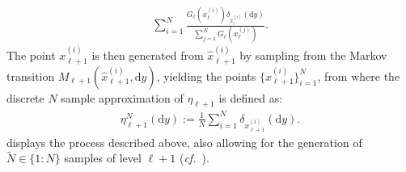 \documentclass{article}
\renewcommand{\d}{{\text{d}}}
\newcommand{\dy}{{\d y}}
\theoremstyle{definition}
\begin{document}
\begin{align}
  \label{eq:sampDist}
  \sum\limits_{i=1}^N\frac{G_{\ell}(x_{\ell}^{(i)})\delta_{x_{\ell}^{(i)}}(\dy)}{\sum_{j=1}^NG_{\ell}(x_{\ell}^{(j)})}.
\end{align}
The point $x_{\ell+1}^{(i)}$ is then generated from $\hat{x}_{\ell+1}^{(i)}$ by sampling from the Markov transition $M_{\ell+1}(\hat{x}_{\ell+1}^{(i)}, \dy)$,
yielding the points $\{x_{\ell+1}^{(i)}\}_{i=1}^N$, from where the discrete $N$ sample approximation of $\eta_{\ell+1}$ is defined as:
\begin{align*}
  \eta_{\ell+1}^{N}(\dy):=\frac{1}{N}\sum\limits_{i=1}^N\delta_{x_{\ell+1}^{(i)}}(\dy).
\end{align*}
 displays the process described above, also allowing for the generation
of $\widetilde{N}\in\{1:N\}$ samples of level $\ell+1$ (\emph{cf.}~\cite[Table~1]{moralMultilevelSequentialMonte2017}).
\end{document}
